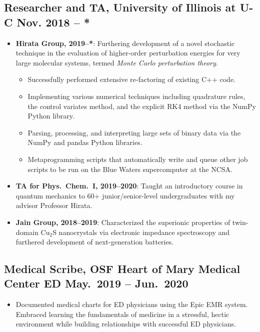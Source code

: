 \documentclass{article}
\begin{document}
\subsection{Researcher and TA, University of Illinois at U-C
            \hfill Nov. 2018 -- *}
\begin{itemize}[noitemsep,nolistsep]
	\item \textbf{Hirata Group, 2019--*}: Furthering development of a novel
		stochastic technique in the evaluation of higher-order
		perturbation energies for very large molecular systems, termed
		\emph{Monte Carlo perturbation theory}.

		\begin{itemize}
			\item Successfully performed extensive re-factoring of
				existing C++ code.

			\item Implementing various numerical techniques
				including quadrature rules, the control variates
				method, and the explicit RK4 method via the
				NumPy Python library.

			\item Parsing, processing, and interpreting large sets
				of binary data via the NumPy and pandas Python
				libraries.

			\item Metaprogramming scripts that automatically write
				and queue other job scripts to be run on the
				Blue Waters supercomputer at the NCSA.
		\end{itemize}

	\item \textbf{TA for Phys.\ Chem.\ I, 2019--2020}: Taught an
		introductory course in quantum mechanics to 60+
		junior/senior-level undergraduates with my advisor Professor
		Hirata.

	\item \textbf{Jain Group, 2018--2019}: Characterized the superionic
		properties of twin-domain Cu$_2$S nanocrystals via electronic
		impedance spectroscopy and furthered development of
		next-generation batteries.
\end{itemize}

\subsection{Medical Scribe, OSF Heart of Mary Medical Center ED \hfill May.\ 2019 -- Jun.\ 2020}
\begin{itemize}[noitemsep, nolistsep]
	\item Documented medical charts for ED physicians using the Epic EMR
		system. Embraced learning the fundamentals of medicine in a
		stressful, hectic environment while building relationships with
		successful ED physicians.
\end{itemize}
\end{document}
